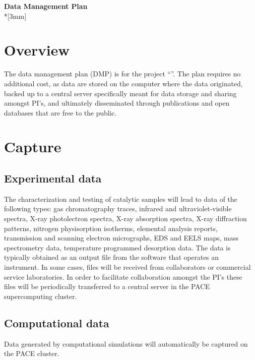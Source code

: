 \renewcommand{\LeftFooter}{Data Management Plan}
\renewcommand{\PageLimit}{2}

\begin{center}
{\bf Data Management Plan} \\*[3mm]
\end{center}

\setcounter{section}{0}

\section{Overview}
The data management plan (DMP) is for the project ``\@title''. The plan requires no additional cost, as data are stored on the computer where the data originated, backed up to a central server specifically meant for data storage and sharing amongst PI’s, and ultimately disseminated through publications and open databases that are free to the public.

\section{Capture}
\subsection{Experimental data}
The characterization and testing of catalytic samples will lead to data of the following types: gas chromatography traces, infrared and ultraviolet-visible spectra, X-ray photolectron spectra, X-ray absorption spectra, X-ray diffraction patterns, nitrogen physisorption isotherms, elemental analysis reports, transmission and scanning electron micrographs, EDS and EELS maps, mass spectrometry data, temperature programmed desorption data. The data is typically obtained as an output file from the software that operates an instrument. In some cases, files will be received from collaborators or commercial service laboratories. In order to facilitate collaboration amongst the PI’s these files will be periodically transferred to a central server in the PACE supercomputing cluster.

\subsection{Computational data}
Data generated by computational simulations will automatically be captured on the PACE cluster.

